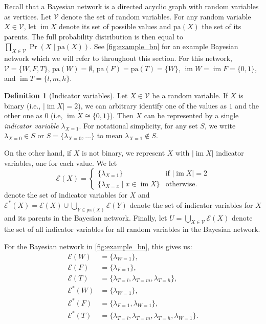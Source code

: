 \documentclass{article}
\theoremstyle{definition}
\newtheorem{definition}{Definition}
\theoremstyle{remark}
\DeclareMathOperator{\im}{im}
\begin{document}
{Recall that a Bayesian network is a directed acyclic graph with random variables
as vertices. Let $\mathcal{V}$ denote the set of random variables. For any
random variable $X \in \mathcal{V}$, let $\im X$ denote its set of possible
values and $\mathrm{pa}(X)$ the set of its parents. The full probability
distribution is then equal to $\prod_{X \in \mathcal{V}} \Pr(X \mid
\mathrm{pa}(X))$. See \cref{fig:example_bn} for an example Bayesian network
which we will refer to throughout this section. For this network, $\mathcal{V} =
\{ W, F, T \}$, $\mathrm{pa}(W) = \emptyset$, $\mathrm{pa}(F) = \mathrm{pa}(T) =
\{ W \}$, $\im W = \im F = \{0, 1 \}$, and $\im T = \{ l, m, h \}$.

\begin{definition}[Indicator variables]
  Let $X \in \mathcal{V}$ be a random variable. If $X$ is binary (i.e., $|\im X|
  = 2$), we can arbitrary identify one of the values as $1$ and the other one as
  $0$ (i.e, $\im X \cong \{ 0, 1 \}$). Then $X$ can be represented by a single
  \emph{indicator variable} $\lambda_{X=1}$. For notational simplicity, for any
  set $S$, we write $\lambda_{X=0} \in S$ or $S = \{ \lambda_{X=0}, \dots \}$ to
  mean $\lambda_{X=1} \not\in S$.

  On the other hand, if $X$ is not binary, we represent $X$ with $|\im X|$
  indicator variables, one for each value. We let
  \[
    \mathcal{E}(X) = \begin{cases}
      \{ \lambda_{X=1} \} & \text{if } |\im X| = 2 \\
      \{ \lambda_{X=x} \mid x \in \im X \} & \text{otherwise.}
    \end{cases}
  \]
  denote the set of indicator variables for $X$ and $\mathcal{E}^*(X) =
  \mathcal{E}(X) \cup \bigcup_{Y \in \mathrm{pa}(X)} \mathcal{E}(Y)$ denote the
  set of indicator variables for $X$ and its parents in the Bayesian network.
  Finally, let $U = \bigcup_{X \in \mathcal{V}} \mathcal{E}(X)$ denote the set
  of all indicator variables for all random variables in the Bayesian network.
\end{definition}

For the Bayesian network in \cref{fig:example_bn}, this gives us:
\begin{align*}
  \mathcal{E}(W) &= \{ \lambda_{W=1} \}, \\
  \mathcal{E}(F) &= \{ \lambda_{F=1} \}, \\
  \mathcal{E}(T) &= \{ \lambda_{T=l}, \lambda_{T=m}, \lambda_{T=h} \}, \\
  \mathcal{E}^*(W) &= \{ \lambda_{W=1} \}, \\
  \mathcal{E}^*(F) &= \{ \lambda_{F=1}, \lambda_{W=1} \}, \\
  \mathcal{E}^*(T) &= \{ \lambda_{T=l}, \lambda_{T=m}, \lambda_{T=h}, \lambda_{W=1} \}.
\end{align*}

}
\end{document}
